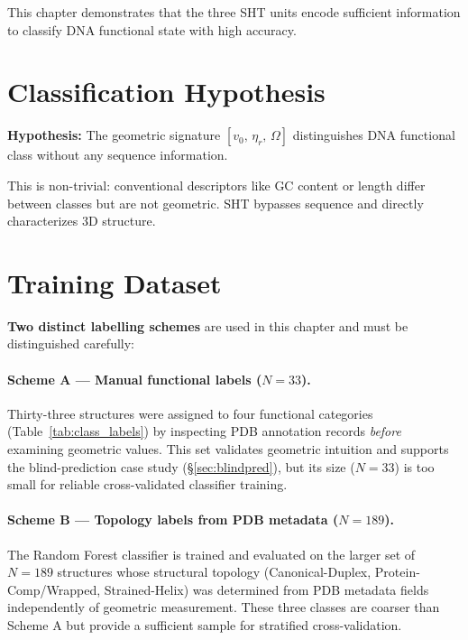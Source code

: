 

This chapter demonstrates that the three SHT units encode sufficient information to classify DNA functional state with high accuracy.

\section{Classification Hypothesis}

\begin{keyresult}
\textbf{Hypothesis:} The geometric signature $[v_0,\,\eta_r,\,\Omega]$ distinguishes DNA functional class without any sequence information.
\end{keyresult}

This is non-trivial: conventional descriptors like GC content or length differ between classes but are not geometric. SHT bypasses sequence and directly characterizes 3D structure.

\section{Training Dataset}

\textbf{Two distinct labelling schemes} are used in this chapter and must be distinguished carefully:

\paragraph{Scheme A --- Manual functional labels ($N = 33$).}
Thirty-three structures were assigned to four functional categories (Table~\ref{tab:class_labels}) by inspecting PDB annotation records \emph{before} examining geometric values. This set validates geometric intuition and supports the blind-prediction case study (\S\ref{sec:blindpred}), but its size ($N = 33$) is too small for reliable cross-validated classifier training.

\paragraph{Scheme B --- Topology labels from PDB metadata ($N = 189$).}
The Random Forest classifier is trained and evaluated on the larger set of $N = 189$ structures whose structural topology (Canonical-Duplex, Protein-Comp/Wrapped, Strained-Helix) was determined from PDB metadata fields independently of geometric measurement. These three classes are coarser than Scheme A but provide a sufficient sample for stratified cross-validation.

